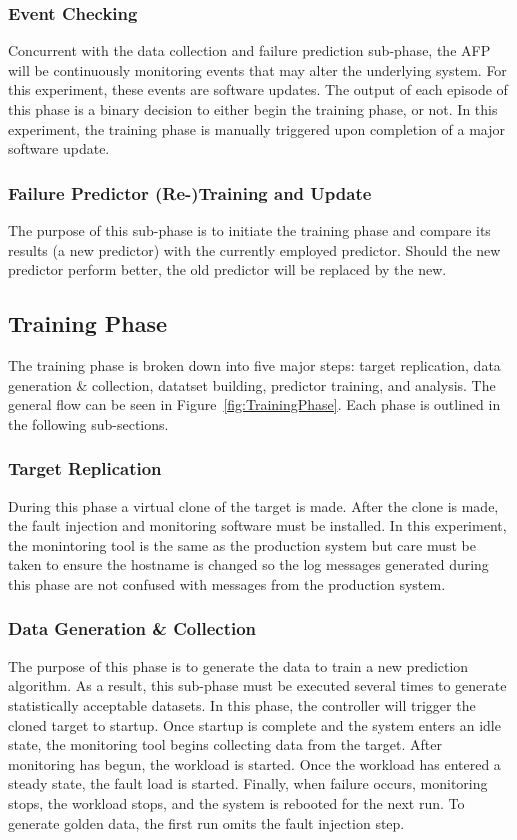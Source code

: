 \subsubsection{Event Checking}
Concurrent with the data collection and failure prediction sub-phase, the AFP
will be continuously monitoring events that may alter the underlying system.
For this experiment, these events are software updates.  The output of each
episode of this phase is a binary decision to either begin the training phase,
or not.  In this experiment, the training phase is manually triggered upon
completion of a major software update.

\subsubsection{Failure Predictor (Re-)Training and Update}
The purpose of this sub-phase is to initiate the training phase and compare its
results (a new predictor) with the currently employed predictor.  Should the
new predictor perform better, the old predictor will be replaced by the new.

\subsection{Training Phase}
The training phase is broken down into five major steps:  target replication,
data generation \& collection, datatset building, predictor training, and
analysis.  The general flow can be seen in Figure~\ref{fig:TrainingPhase}.
Each phase is outlined in the following sub-sections.

\figTrainingPhase

\subsubsection{Target Replication}
During this phase a virtual clone of the target is made.  After the clone is
made, the fault injection and monitoring software must be installed.  In this
experiment, the monintoring tool is the same as the production system but care
must be taken to ensure the hostname is changed so the log messages generated
during this phase are not confused with messages from the production system.

\subsubsection{Data Generation \& Collection}
The purpose of this phase is to generate the data to train a new prediction
algorithm.  As a result, this sub-phase must be executed several times to
generate statistically acceptable datasets.  In this phase, the controller will
trigger the cloned target to startup.  Once startup is complete and the system
enters an idle state, the monitoring tool begins collecting data from the
target.  After monitoring has begun, the workload is started.  Once the
workload has entered a steady state, the fault load is started.  Finally, when
failure occurs, monitoring stops, the workload stops, and the system is
rebooted for the next run.  To generate golden data, the first run omits the
fault injection step.

